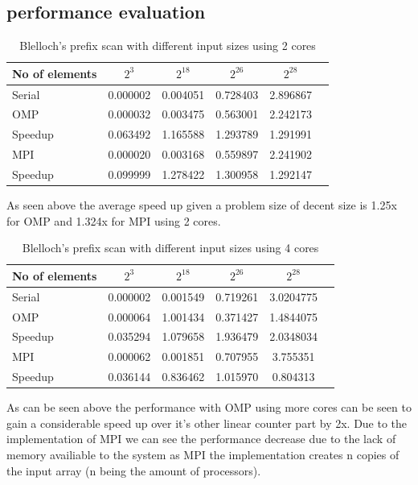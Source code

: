 \subsection{performance evaluation}
\begin{table}[htb]
	\centering
	\caption{Blelloch's prefix scan with different input sizes using 2 cores}\label{tab:example}
	\begin{tabular}{l|ccccc}
		\toprule
		No of elements& $2^3$ & $2^{18}$  & $2^{26}$ & $2^{28}$\\
		\midrule
		Serial &0.000002	&0.004051&0.728403&2.896867\\
		OMP &0.000032		&0.003475&0.563001&2.242173 \\
		Speedup &0.063492	&1.165588&1.293789&1.291991\\
		MPI &0.000020		&0.003168&0.559897&2.241902\\
		Speedup &0.099999	&1.278422&1.300958&1.292147\\
		\bottomrule
	\end{tabular}
\end{table}
As seen above the average speed up given a problem size of decent size is 1.25x for OMP and 1.324x for MPI using 2 cores. 
\begin{table}[htb]
	\centering
	\caption{Blelloch's prefix scan with different input sizes using 4 cores}\label{tab:example}
	\begin{tabular}{l|ccccc}
		\toprule
		No of elements& $2^3$ & $2^{18}$  & $2^{26}$ & $2^{28}$\\
		\midrule
		Serial 	&0.000002 	&0.001549&0.719261&3.0204775\\
		OMP 	&0.000064	&1.001434&0.371427&1.4844075\\
		Speedup &0.035294	&1.079658&1.936479&2.0348034\\
		MPI 	&0.000062	&0.001851&0.707955&3.755351\\
		Speedup &0.036144	&0.836462&1.015970&0.804313\\
		\bottomrule
	\end{tabular}
\end{table}
As can be seen above the performance with OMP using more cores can be seen to gain a considerable speed up over it's other linear counter part by 2x. Due to the implementation of MPI we can see the performance decrease due to the lack of memory availiable to the system as MPI the implementation creates n copies of the input array (n being the amount of processors). 
\pagebreak
